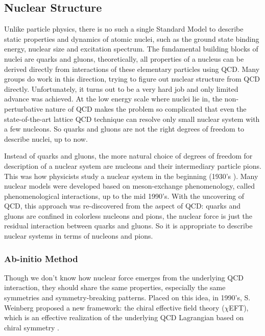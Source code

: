 \subsection{Nuclear Structure}
\begin{comment}
    QCD ==> EFT ==> Interactions ==> ab-initio ==> shell model ==> DFT
\end{comment}
Unlike particle physics, there is no such a single Standard Model to describe
static properties and dynamics of atomic nuclei, such as the ground state binding energy,
nuclear size and excitation spectrum. 
The fundamental building blocks of nuclei are quarks and gluons, theoretically, 
all properties of a nucleus can be derived directly from interactions
of these elementary particles using QCD. 
Many groups do work in this direction, trying to figure out nuclear structure from QCD 
directly. Unfortunately, it turns out to be a very hard job and only limited advance
was achieved. At the low energy scale where nuclei lie in, the non-perturbative nature of 
QCD makes the problem so complicated that even the state-of-the-art lattice QCD
technique can resolve only small nuclear system with a few nucleons.
So quarks and gluons are not the right degrees of freedom to describe nuclei, up
to now.

Instead of quarks and gluons, the more natural choice of degrees of freedom for
description of a nuclear system are nucleons and their intermediary particle pions.
This was how physicists study a nuclear system in the beginning (1930's \cite{10.1143/PTPS.1.1,}). 
Many nuclear models were developed based on meson-exchange phenomenology, called
phenomenological interactions, up to the mid 1990's.
With the uncovering of QCD, this approach was re-discovered from the aspect of QCD:
quarks and gluons are confined in colorless nucleons and pions, the nuclear force
is just the residual interaction between quarks and gluons. So it is appropriate
to describe nuclear systems in terms of nucleons and pions.

\subsubsection{Ab-initio Method}
Though we don't know how nuclear force emerges from the underlying QCD interaction,
they should share the same properties, especially the same symmetries and symmetry-breaking
patterns. %
Placed on this idea, in 1990's, S. Weinberg proposed a new framework: the chiral 
effective field theory ($\chi$EFT), which is an effective realization of the 
underlying QCD Lagrangian based on chiral symmetry \cite{WEINBERG}.

